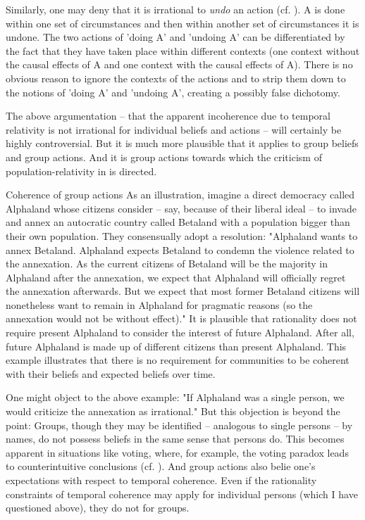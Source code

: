 Similarly, one may deny that it is irrational to \emph{undo} an action (cf. ). A is done within one set of circumstances and then within another set of circumstances it is undone. The two actions of 'doing A' and 'undoing A' can be differentiated by the fact that they have taken place within different contexts (one context without the causal effects of A and one context with the causal effects of A). There is no obvious reason to ignore the contexts of the actions and to strip them down to the notions of 'doing A' and 'undoing A', creating a possibly false dichotomy. 

The above argumentation -- that the apparent incoherence due to temporal relativity is not irrational for individual beliefs and actions -- will certainly be highly controversial. But it is much more plausible that it applies to group beliefs and group actions. And it is group actions towards which the criticism of population-relativity in  is directed. 

\begin{Example}{Coherence of group actions}{}
As an illustration, imagine a direct democracy called Alphaland whose citizens consider -- say, because of their liberal ideal -- to invade and annex an autocratic country called Betaland with a population bigger than their own population. They consensually adopt a resolution: "Alphaland wants to annex Betaland. Alphaland expects Betaland to condemn the violence related to the annexation. As the current citizens of Betaland will be the majority in Alphaland after the annexation, we expect that Alphaland will officially regret the annexation afterwards. But we expect that most former Betaland citizens will nonetheless want to remain in Alphaland for pragmatic reasons (so the annexation would not be without effect)." It is plausible that rationality does not require present Alphaland to consider the interest of future Alphaland. After all, future Alphaland is made up of different citizens than present Alphaland. This example illustrates that there is no requirement for communities to be coherent with their beliefs and expected beliefs over time. 
\end{Example}

One might object to the above example: "If Alphaland was a single person, we would criticize the annexation as irrational." But this objection is beyond the point: Groups, though they may be identified -- analogous to single persons -- by names, do not possess beliefs in the same sense that persons do. This becomes apparent in situations like voting, where, for example, the voting paradox leads to counterintuitive conclusions (cf. ). And group actions also belie one's expectations with respect to temporal coherence. Even if the rationality constraints of temporal coherence may apply for individual persons (which I have questioned above), they do not for groups. 

